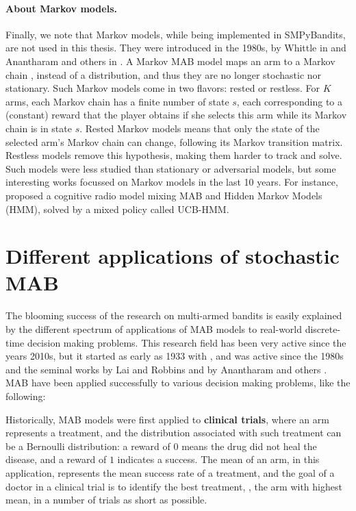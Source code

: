 \paragraph{About Markov models.}
%
Finally, we note that Markov models, while being implemented in SMPyBandits, are not used in this thesis.
They were introduced in the 1980s, by Whittle in \cite{Whittle1988} and Anantharam and others in \cite{Anantharam87b}.
A Markov MAB model maps an arm to a Markov chain \cite{Norris98}, instead of a distribution, and thus they are no longer stochastic nor stationary.
Such Markov models come in two flavors: rested or restless.
For $K$ arms, each Markov chain has a finite number of state $s$, each corresponding to a (constant) reward that the player obtains if she selects this arm while its Markov chain is in state $s$.
Rested Markov models means that only the state of the selected arm's Markov chain can change, following its Markov transition matrix.
Restless models remove this hypothesis, making them harder to track and solve.
%
Such models were less studied than stationary or adversarial models, but some interesting works focussed on Markov models in the last 10 years.
For instance, \cite{Melian15} proposed a cognitive radio model mixing MAB and Hidden Markov Models (HMM), solved by a mixed policy called UCB-HMM.


\section{Different applications of stochastic MAB}
\label{sec:2:applicationsofStochasticMAB}

The blooming success of the research on multi-armed bandits is easily explained by the different spectrum of applications of MAB models to real-world discrete-time decision making problems.
This research field has been very active since the years 2010s, but it started as early as 1933 with \cite{Thompson33}, and was active since the 1980s and the seminal works by Lai and Robbins \cite{LaiRobbins85} and by Anantharam and others \cite{Anantharam87a}.
%
MAB have been applied successfully to various decision making problems, like the following:

Historically, MAB models were first applied to \textbf{clinical trials}, where an arm represents a treatment, and the distribution associated with such treatment can be a Bernoulli distribution: a reward of $0$ means the drug did not heal the disease, and a reward of $1$ indicates a success. The mean of an arm, in this application, represents the mean success rate of a treatment, and the goal of a doctor in a clinical trial is to identify the best treatment, \ie, the arm with highest mean, in a number of trials as short as possible.
%


